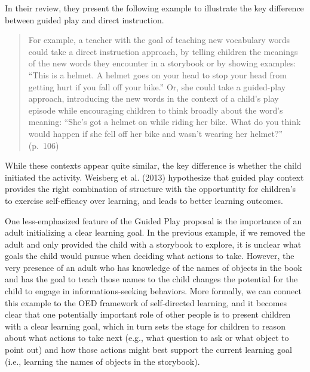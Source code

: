 \documentclass[english,floatsintext,man]{apa6}
\theoremstyle{definition}
\theoremstyle{definition}
\theoremstyle{definition}
\theoremstyle{remark}
\begin{document}
In their review, they present the following example to illustrate the
key difference between guided play and direct instruction.

\begin{quote}
For example, a teacher with the goal of teaching new vocabulary words
could take a direct instruction approach, by telling children the
meanings of the new words they encounter in a storybook or by showing
examples: \enquote{This is a helmet. A helmet goes on your head to stop
your head from getting hurt if you fall off your bike.} Or, she could
take a guided-play approach, introducing the new words in the context of
a child's play episode while encouraging children to think broadly about
the word's meaning: \enquote{She's got a helmet on while riding her
bike. What do you think would happen if she fell off her bike and wasn't
wearing her helmet?} (p.~106)
\end{quote}

\noindent
While these contexts appear quite similar, the key difference is whether
the child initiated the activity. Weisberg et al. (2013) hypothesize
that guided play context provides the right combination of structure
with the opportuntity for children's to exercise self-efficacy over
learning, and leads to better learning outcomes.

One less-emphasized feature of the Guided Play proposal is the
importance of an adult initializing a clear learning goal. In the
previous example, if we removed the adult and only provided the child
with a storybook to explore, it is unclear what goals the child would
pursue when deciding what actions to take. However, the very presence of
an adult who has knowledge of the names of objects in the book and has
the goal to teach those names to the child changes the potential for the
child to engage in informations-seeking behaviors. More formally, we can
connect this example to the OED framework of self-directed learning, and
it becomes clear that one potentially important role of other people is
to present children with a clear learning goal, which in turn sets the
stage for children to reason about what actions to take next (e.g., what
question to ask or what object to point out) and how those actions might
best support the current learning goal (i.e., learning the names of
objects in the storybook).
\end{document}
